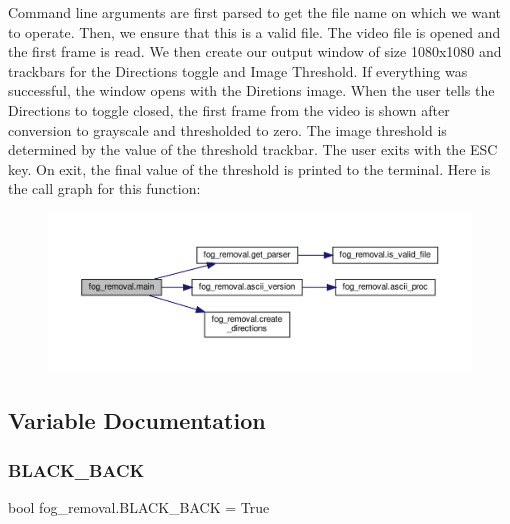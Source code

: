 Command line arguments are first parsed to get the file name on which we want to operate. Then, we ensure that this is a valid file. The video file is opened and the first frame is read. We then create our output window of size 1080x1080 and trackbars for the Directions toggle and Image Threshold. If everything was successful, the window opens with the Diretions image. When the user tells the Directions to toggle closed, the first frame from the video is shown after conversion to grayscale and thresholded to zero. The image threshold is determined by the value of the threshold trackbar. The user exits with the E\+SC key. On exit, the final value of the threshold is printed to the terminal. Here is the call graph for this function\+:
\nopagebreak
\begin{figure}[H]
\begin{center}
\leavevmode
\includegraphics[width=350pt]{namespacefog__removal_a427a577da8405e5624962d7ef722aadf_cgraph}
\end{center}
\end{figure}


\subsection{Variable Documentation}
\mbox{\label{namespacefog__removal_ad88aa1ec890d366b2f2c71131bc1f657}} 
\subsubsection{\texorpdfstring{B\+L\+A\+C\+K\+\_\+\+B\+A\+CK}{BLACK\_BACK}}
{\footnotesize\ttfamily bool fog\+\_\+removal.\+B\+L\+A\+C\+K\+\_\+\+B\+A\+CK = True}

